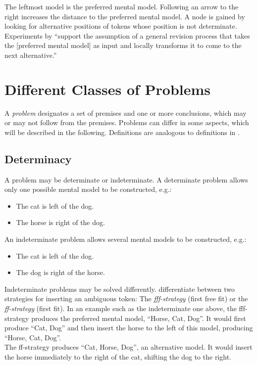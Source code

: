 \documentclass[hidelinks]{scrartcl}
\begin{document}
The leftmost model is the preferred mental model. Following an arrow to the right increases the distance to the preferred mental model. A node is gained by looking for alternative positions of tokens whose position is not determinate. Experiments by \cite{Rauh.2005} ``support the assumption of a general revision process that takes the [preferred mental model] as input and locally transforms it to come to the next alternative.''

\section{Different Classes of Problems}
A \textit{problem} designates a set of premises and one or more conclusions, which may or may not follow from the premises. Problems can differ in some aspects, which will be described in the following. Definitions are analogous to definitions in \cite{Ragni.2013}.

\subsection{Determinacy}\label{sec:determinacy}
A problem may be determinate or indeterminate. A determinate problem allows only one possible mental model to be constructed, e.g.:
\begin{itemize}
\item The cat is left of the dog.
\item The horse is right of the dog.
\end{itemize}

\noindent An indeterminate problem allows several mental models to be constructed, e.g.:
\begin{itemize}
\item The cat is left of the dog.
\item The dog is right of the horse.
\end{itemize}

Indeterminate problems may be solved differently. \cite{Ragni.2013} differentiate between two strategies for inserting an ambiguous token: The \textit{fff-strategy} (first free fit) or the \textit{ff-strategy} (first fit). In an example such as the indeterminate one above, the fff-strategy produces the preferred mental model, ``Horse, Cat, Dog''. It would first produce ``Cat, Dog'' and then insert the horse to the left of this model, producing ``Horse, Cat, Dog''. \\
The ff-strategy produces ``Cat, Horse, Dog'', an alternative model. It would insert the horse immediately to the right of the cat, shifting the dog to the right. 
\end{document}
